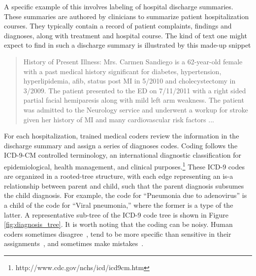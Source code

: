 A specific example of this involves labeling of hospital discharge summaries.  These summaries are authored by clinicians to summarize patient
hospitalization courses. They typically contain a record of patient
complaints, findings and diagnoses, along with treatment and hospital course.  The kind of text one might expect to find in such a discharge summary is illustrated by this made-up snippet
\begin{quote}
{History of Present Illness: Mrs. Carmen Sandiego is a 62-year-old female with a past medical history significant for diabetes, hypertension, hyperlipidemia, afib, status post MI in 5/2010 and cholecystectomy in 3/2009.  The patient presented to the ED on 7/11/2011 with a right sided partial facial hemiparesis along with mild left arm weakness.  The patient was admitted to the Neurology service and underwent a workup for stroke given her history of MI and many cardiovascular risk factors ...}
\end{quote} 
For each hospitalization, trained medical coders review the information in the
discharge summary and assign a series of diagnoses codes. Coding follows the
ICD-9-CM controlled terminology, an international diagnostic classification for
epidemiological, health management, and clinical
purposes.\footnote{http://www.cdc.gov/nchs/icd/icd9cm.htm}  These ICD-9 codes are organized in a rooted-tree structure, with each
edge representing an is-a relationship between parent and child, such that the
parent diagnosis subsumes the child diagnosis. For example, the code for
{}``Pneumonia due to adenovirus'' is a child of the code for {}``Viral
pneumonia,'' where the former is a type of the latter.  A representative sub-tree of the ICD-9 code tree is shown in Figure \ref{fig:diagnosis_tree}. It is worth noting that
the coding can be noisy. Human coders sometimes disagree~\cite{Challenge07},
tend to be more specific than sensitive in their
assignments~\cite{Birmetal2005}, and sometimes make
mistakes~\cite{FarzandipourEtAl10}.


